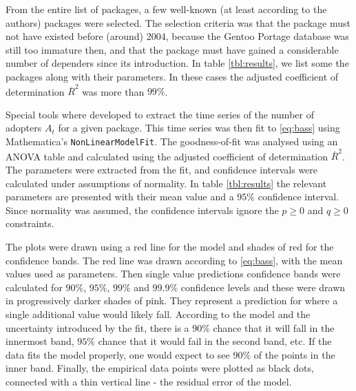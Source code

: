 \documentclass[smallextended,final]{svjour3}
\begin{document}

From the entire list of packages, a few well-known (at least according to the authors) packages were selected. The selection criteria was that the package must not have existed before (around) 2004, because the Gentoo Portage database was still too immature then, and that the package must have gained a considerable number of dependers since its introduction. In table \ref{tbl:results}, we list some the packages along with their parameters. In these cases the adjusted coefficient of determination $\overline{R}^2$ was more than $99\%$.

Special tools where developed to extract the time series of the number of adopters $A_t$ for a given package. This time series was then fit to \eqref{eq:bass} using Mathematica's \texttt{NonLinearModelFit}. The goodness-of-fit was analysed using an ANOVA table and calculated using the adjusted coefficient of determination $\overline{R}^2$. The parameters were extracted from the fit, and confidence intervals were calculated under assumptions of normality. In table \ref{tbl:results} the relevant parameters are presented with their mean value and a $95\%$ confidence interval. Since normality was assumed, the confidence intervals ignore the $p \ge 0$ and $q \ge 0$ constraints. 

The plots were drawn using a red line for the model and shades of red for the confidence bands. The red line was drawn according to \eqref{eq:bass}, with the mean values used as parameters. Then single value predictions confidence bands were calculated for $90\%$, $95\%$, $99\%$ and $99.9\%$ confidence levels and these were drawn in progressively darker shades of pink. They represent a prediction for where a single additional value would likely fall. According to the model and the uncertainty introduced by the fit, there is a $90\%$ chance that it will fall in the innermost band, $95\%$ chance that it would fail in the second band, etc. If the data fits the model properly, one would expect to see $90\%$ of the points in the inner band. Finally, the empirical data points were plotted as black dots, connected with a thin vertical line - the residual error of the model.
\end{document}
